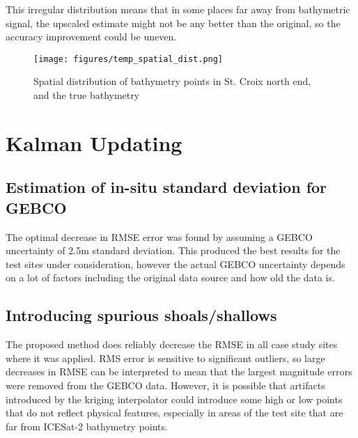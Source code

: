 This irregular distribution means that in some places far away from bathymetric signal, the upscaled estimate might not be any better than the original, so the accuracy improvement could be uneven. 

\begin{figure}[h!]
    \centering
    \texttt{[image: figures/temp\_spatial\_dist.png]}
    \caption{Spatial distribution of bathymetry points in St. Croix north end, and the true bathymetry}
    \label{fig:distribution-of-bathy-points-in-space}
\end{figure}



\section{Kalman Updating}


\subsection{Estimation of in-situ standard deviation for GEBCO}



The optimal decrease in RMSE error was found by assuming a GEBCO uncertainty of 2.5m standard deviation. This produced the best results for the test sites under consideration, however the actual GEBCO uncertainty depends on a lot of factors including the original data source and how old the data is. 

\subsection{Introducing spurious shoals/shallows}

The proposed method does reliably decrease the RMSE in all case study sites where it was applied. RMS error is sensitive to significant outliers, so large decreases in RMSE can be interpreted to mean that the largest magnitude errors were removed from the GEBCO data. However, it is possible that artifacts introduced by the kriging interpolator could introduce some high or low points that do not reflect physical features, especially in areas of the test site that are far from ICESat-2 bathymetry points.